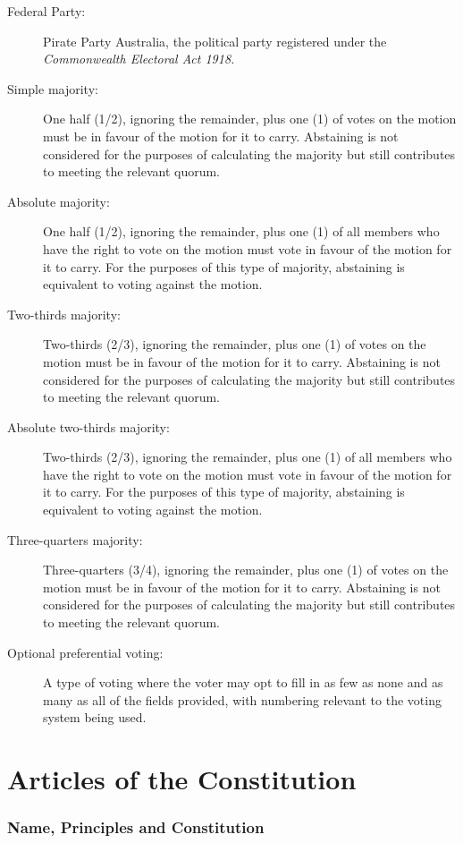\documentclass[a4paper,titlepage,8.5pt]{article}
\begin{document}
\begin{description}
\item[Federal Party:] Pirate Party Australia, the political party registered under the \textit{Commonwealth Electoral Act 1918.}
\item[Simple majority:] One half (1/2), ignoring the remainder, plus one (1) of votes on the motion must be in favour of the motion for it to carry. Abstaining is not considered for the purposes of calculating the majority but still contributes to meeting the relevant quorum.
\item[Absolute majority:] One half (1/2), ignoring the remainder, plus one (1) of all members who have the right to vote on the motion must vote in favour of the motion for it to carry. For the purposes of this type of majority, abstaining is equivalent to voting against the motion.
\item[Two-thirds majority:] Two-thirds (2/3), ignoring the remainder, plus one (1) of votes on the motion must be in favour of the motion for it to carry. Abstaining is not considered for the purposes of calculating the majority but still contributes to meeting the relevant quorum.
\item[Absolute two-thirds majority:] Two-thirds (2/3), ignoring the remainder, plus one (1) of all members who have the right to vote on the motion must vote in favour of the motion for it to carry. For the purposes of this type of majority, abstaining is equivalent to voting against the motion.
\item[Three-quarters majority:] Three-quarters (3/4), ignoring the remainder, plus one (1) of votes on the motion must be in favour of the motion for it to carry. Abstaining is not considered for the purposes of calculating the majority but still contributes to meeting the relevant quorum.
\item[Optional preferential voting:] A type of voting where the voter may opt to fill in as few as none and as many as all of the fields provided, with numbering relevant to the voting system being used.
\end{description}

\part{Articles of the Constitution}

\section{Name, Principles and Constitution}
\end{document}

